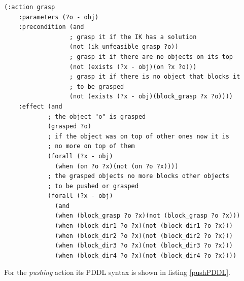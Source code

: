 \lstset{language=pddl}
\begin{lstlisting}[caption={PDDL syntax of the grasping action},label=graspPDDL]
(:action grasp
    :parameters (?o - obj)
    :precondition (and
                  ; grasp it if the IK has a solution
                  (not (ik_unfeasible_grasp ?o))    
                  ; grasp it if there are no objects on its top
                  (not (exists (?x - obj)(on ?x ?o)))
                  ; grasp it if there is no object that blocks it
                  ; to be grasped
                  (not (exists (?x - obj)(block_grasp ?x ?o))))
    :effect (and
            ; the object "o" is grasped
            (grasped ?o)
            ; if the object was on top of other ones now it is
            ; no more on top of them
            (forall (?x - obj)
              (when (on ?o ?x)(not (on ?o ?x))))
            ; the grasped objects no more blocks other objects 
            ; to be pushed or grasped
            (forall (?x - obj)
              (and
              (when (block_grasp ?o ?x)(not (block_grasp ?o ?x)))
              (when (block_dir1 ?o ?x)(not (block_dir1 ?o ?x)))
              (when (block_dir2 ?o ?x)(not (block_dir2 ?o ?x)))
              (when (block_dir3 ?o ?x)(not (block_dir3 ?o ?x)))
              (when (block_dir4 ?o ?x)(not (block_dir4 ?o ?x))))
\end{lstlisting}

For the \textit{pushing} action its PDDL syntax is shown in listing \ref{pushPDDL}.

